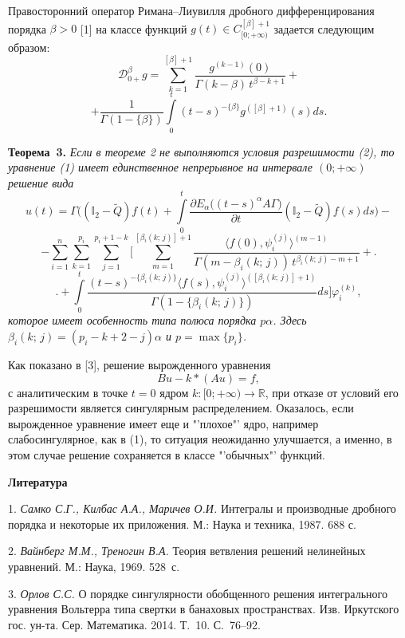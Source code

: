 Правосторонний оператор Римана--Лиувилля дробного дифференцирования порядка $\beta>0$   [1] на классе функций $g(t)\in C_{[0;+\infty)}^{[\beta]+1}$ задается следующим образом:
$$
{\mathscr D}^{\beta}_{0+}g=\sum\limits_{k=1}^{[\beta]+1}\frac{g^{(k-1)}(0)}{\Gamma(k-\beta)\,t^{\beta-k+1}}+
$$
$$
+\frac{1}{\Gamma(1-\lbrace\beta\rbrace)}\int\limits_{0}^{t}(t-s)^{-\lbrace\beta\rbrace}g^{([\beta]+1)}(s)ds.
$$

\textbf{Теорема~3.} {\it Если в теореме 2 не выполняются условия разрешимости (2), то уравнение (1) имеет единственное непрерывное на интервале $(0; +\infty)$ решение вида
$$
u(t)=\Gamma\biggl((\mathbb I_{2}-\tilde{Q})f(t)+\int\limits_{0}^{t}\frac{\partial E_{\alpha}\bigl((t-s)^{\alpha}A\Gamma\bigr)}{\partial t}(\mathbb I_{2}-\tilde{Q})f(s)ds\biggr)-
$$
$$
-\sum\limits_{i=1}^{n}\sum\limits_{k=1}^{p_{i}}\sum\limits_{j=1}^{p_{i}+1-k}\biggl[\sum\limits_{m=1}^{[\beta_{i}(k;\,j)]+1}\frac{\langle f(0),\psi_{i}^{(j)}\rangle^{(m-1)}}{\Gamma(m-\beta_{i}(k;\,j))\,t^{\beta_{i}(k;\,j)-m+1}}+\biggr.
$$
$$
\biggl.+\int\limits_{0}^{t}\frac{(t-s)^{-\lbrace\beta_{i}(k;\,j)\rbrace}\langle f(s),\psi_{i}^{(j)}\rangle^{([\beta_{i}(k;\,j)]+1)}}{\Gamma(1-\lbrace\beta_{i}(k;\,j)\rbrace)}ds\biggr]\varphi_{i}^{(k)},
$$
которое имеет особенность типа полюса порядка $p\alpha$. Здесь $\beta_{i}(k;\,j)=(p_{i}-k+2-j)\alpha$ и $p=\max\lbrace p_{i}\rbrace$.}

Как показано в [3], решение вырожденного уравнения
$$
Bu-k\ast(Au)=f,
$$
с аналитическим в точке $t=0$ ядром $k: [0;+\infty)\to{\mathbb R}$, при отказе  от условий его разрешимости является сингулярным распределением. Оказалось, если вырожденное уравнение имеет еще и "'плохое"' ядро, например слабосингулярное, как в (1), то ситуация неожиданно улучшается, а именно, в этом случае решение сохраняется в классе "'обычных"' функций.
\\
\smallskip \centerline{\bf Литература}\nopagebreak

1. {\it Самко С.Г., Килбас А.А., Маричев О.И.} Интегралы и производные дробного порядка и некоторые их приложения. М.: Наука и техника, 1987. 688 с.

2. {\it Вайнберг М.М., Треногин В.А.} Теория ветвления решений нелинейных уравнений. М.: Наука, 1969. 528~с.

3. {\it Орлов С.С.} О порядке сингулярности обобщенного решения интегрального уравнения Вольтерра типа свертки в банаховых пространствах. Изв. Иркутского гос. ун-та. Сер. Математика. 2014. Т.~10. С.~76--92.
